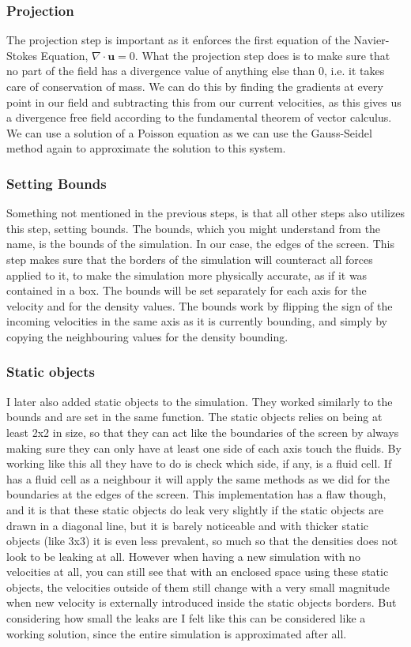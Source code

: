 \documentclass{article}
\begin{document}
\begin{multicols}{2}
\subsubsection{Projection}
The projection step is important as it enforces the first equation of the Navier-Stokes Equation, $\nabla \cdot \bm{u}=0$. What the projection step does is to make sure that no part of the field has a divergence value of anything else than $0$, i.e. it takes care of conservation of mass. We can do this by finding the gradients at every point in our field and subtracting this from our current velocities, as this gives us a divergence free field according to the fundamental theorem of vector calculus. We can use a solution of a Poisson equation as we can use the Gauss-Seidel method again to approximate the solution to this system.

\subsubsection{Setting Bounds}
Something not mentioned in the previous steps, is that all other steps also utilizes this step, setting bounds. The bounds, which you might understand from the name, is the bounds of the simulation. In our case, the edges of the screen. This step makes sure that the borders of the simulation will counteract all forces applied to it, to make the simulation more physically accurate, as if it was contained in a box. The bounds will be set separately for each axis for the velocity and for the density values. The bounds work by flipping the sign of the incoming velocities in the same axis as it is currently bounding, and simply by copying the neighbouring values for the density bounding.

\subsubsection{Static objects}
I later also added static objects to the simulation. They worked similarly to the bounds and are set in the same function. The static objects relies on being at least 2x2 in size, so that they can act like the boundaries of the screen by always making sure they can only have at least one side of each axis touch the fluids. By working like this all they have to do is check which side, if any, is a fluid cell. If has a fluid cell as a neighbour it will apply the same methods as we did for the boundaries at the edges of the screen. This implementation has a flaw though, and it is that these static objects do leak very slightly if the static objects are drawn in a diagonal line, but it is barely noticeable and with thicker static objects (like 3x3) it is even less prevalent, so much so that the densities does not look to be leaking at all. However when having a new simulation with no velocities at all, you can still see that with an enclosed space using these static objects, the velocities outside of them still change with a very small magnitude when new velocity is externally introduced inside the static objects borders. But considering how small the leaks are I felt like this can be considered like a working solution, since the entire simulation is approximated after all.


\end{multicols}
\end{document}
